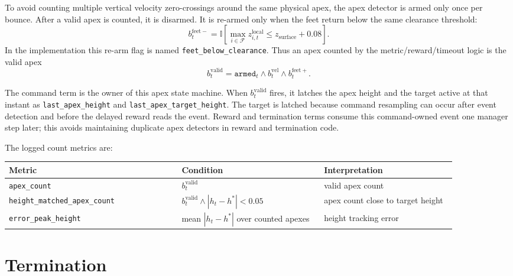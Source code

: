 \documentclass[11pt, a4paper]{article}
\begin{document}
To avoid counting multiple vertical velocity zero-crossings around the same
physical apex, the apex detector is armed only once per bounce. After a valid
apex is counted, it is disarmed. It is re-armed only when the feet
return below the same clearance threshold:
\begin{equation}
    b^{\mathrm{feet-}}_t =
    \mathbb{I}
    \left[
    \max_{i\in\mathcal{F}} z^{\mathrm{local}}_{i,t}
    \le z_{\mathrm{surface}} + 0.08
    \right].
\end{equation}
In the implementation this re-arm flag is named
\texttt{feet\_below\_clearance}. Thus an apex counted by the
metric/reward/timeout logic is the valid apex
\begin{equation}
    b^{\mathrm{valid}}_t =
    \texttt{armed}_t
    \wedge b^{\mathrm{vel}}_t
    \wedge b^{\mathrm{feet+}}_t.
\end{equation}

The command term is the owner of this apex state machine. When
$b^{\mathrm{valid}}_t$ fires, it latches the apex height and the target active
at that instant as \texttt{last\_apex\_height} and
\texttt{last\_apex\_target\_height}. The target is latched because command
resampling can occur after event detection and before the delayed reward reads
the event. Reward and termination terms consume this command-owned event one
manager step later; this avoids maintaining duplicate apex detectors in reward
and termination code.

The logged count metrics are:
\begin{center}
\begin{tabular}{p{0.34\linewidth}p{0.28\linewidth}p{0.26\linewidth}}
\hline
Metric & Condition & Interpretation \\
\hline
\texttt{apex\_count} & $b^{\mathrm{valid}}_t$ & valid apex count \\
\texttt{height\_matched\_apex\_count} &
$b^{\mathrm{valid}}_t \wedge |h_t-h^{*}|<0.05$ &
apex count close to target height \\
\texttt{error\_peak\_height} &
mean $|h_t-h^{*}|$ over counted apexes &
height tracking error \\
\hline
\end{tabular}
\end{center}

\section{Termination}
\end{document}
